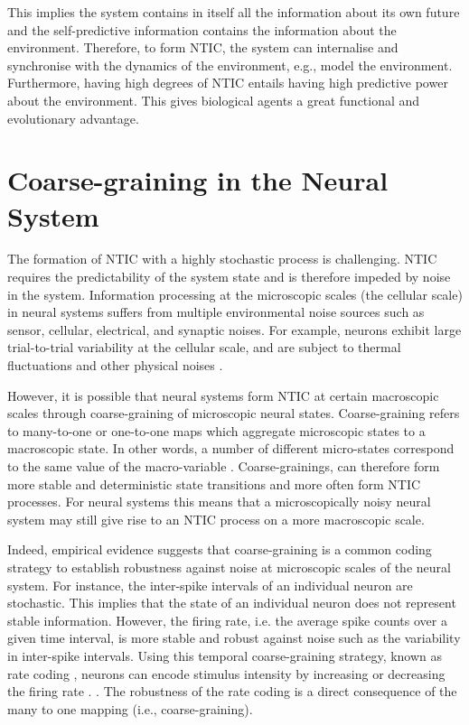 \documentclass[utf8]{article}
\begin{document}
			\noindent
			This implies the system contains in itself all the information about its own future and the self-predictive information contains the information about the environment. Therefore, to form NTIC, the system can internalise and synchronise with the dynamics of the environment, e.g., model the environment. Furthermore, having high degrees of NTIC entails having high predictive power about the environment. This gives biological agents a great functional and evolutionary advantage. 
			

	\section{Coarse-graining in the Neural System} \label{sec:Neural coarse-graining}

		The formation of NTIC with a  highly stochastic process is challenging. NTIC requires the predictability of the system state and is therefore impeded by noise in the system. Information processing at the microscopic scales (the cellular scale) in neural systems suffers from multiple environmental noise sources such as sensor, cellular, electrical, and synaptic noises. For example, neurons exhibit large trial-to-trial variability at the cellular scale, and are subject to thermal fluctuations and other physical noises \citep{faisal2008noise}. 
		
  
		However, it is possible that neural systems form NTIC at certain macroscopic scales through coarse-graining of microscopic neural states. Coarse-graining refers to many-to-one or one-to-one maps which aggregate microscopic states to a macroscopic state. In other words, a number of different micro-states correspond to the same value of the macro-variable \citep{price2007causation}. Coarse-grainings, can therefore form more stable and deterministic state transitions and more often form NTIC processes. For neural systems this means that a microscopically noisy neural system may still give rise to an NTIC process on a more macroscopic scale.
		
		Indeed, empirical evidence suggests that coarse-graining is a common coding strategy to establish robustness against noise at microscopic scales of the neural system. For instance, the inter-spike intervals of an individual neuron are stochastic. This implies that the state of an individual neuron does not represent stable information. However, the firing rate, i.e. the average spike counts over a given time interval, is more stable and robust against noise such as the variability in inter-spike intervals. Using this temporal coarse-graining strategy, known as rate coding \citep{adrian1926impulses, gerstner2002spiking, maass2001pulsed, panzeri2015neural, stein2005neuronal}, neurons can encode stimulus intensity by increasing or decreasing the firing rate \citep{kandel2000principles}. \citep{stein2005neuronal}. The robustness of the rate coding is a direct consequence of the many to one mapping (i.e., coarse-graining).
		
\end{document}
